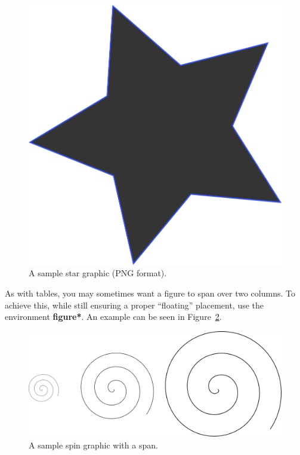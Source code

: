 \documentclass[sigconf]{acmart}
\begin{document}
\begin{figure}
    \centering
    \includegraphics[scale=0.5]{star.png}
    \caption{A sample star graphic (PNG format).}
    \label{fig:star}
\end{figure}

As with tables, you may sometimes want a figure to span over two columns.  To
achieve this, while still ensuring a proper ``floating'' placement, use the
environment \textbf{figure*}.  An example can be seen in
Figure~\ref{fig:spin}.

\begin{figure}
    \vspace{0.5cm} %
    \centering
    \includegraphics[scale=0.8]{spin.png}
    \caption{A sample spin graphic with a span.}
    \label{fig:spin}
\end{figure}
\end{document}
